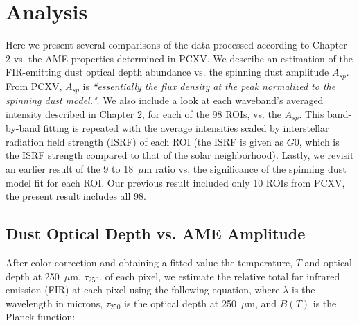 \chapter{Analysis}
     Here we present several comparisons of the data processed according to Chapter 2 vs. the AME properties determined in PCXV.  We describe an estimation of the FIR-emitting dust optical depth abundance vs. the spinning dust amplitude $A_{sp}$. From PCXV, $A_{sp}$ is \textit{``essentially the flux density at the peak normalized to the spinning dust model."}.  We also include a look at each waveband's averaged intensity described in Chapter 2, for each of the 98 ROIs, vs. the $A_{sp}$. This band-by-band fitting is repeated with the average intensities scaled by interstellar radiation field strength (ISRF) of each ROI (the ISRF is given as $G0$, which is the ISRF strength compared to that of the solar neighborhood). Lastly, we revisit an earlier result of the 9 to 18~$\mu$m ratio vs. the significance of the spinning dust model fit for each ROI. Our previous result included only 10 ROIs from PCXV, the present result includes all 98.

\section{Dust Optical Depth vs. AME Amplitude}
     After color-correction and obtaining a fitted value the temperature, $T$ and optical depth at 250~$\mu$m, $\tau_{250}$. of each pixel, we estimate the relative total far infrared emission (FIR) at each pixel using the following equation, where $\lambda$ is the wavelength in microns, $\tau_{250}$ is the optical depth at 250~$\mu$m, and $B(T)$ is the Planck function:

